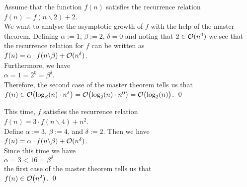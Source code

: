 \example
Assume that the function $f(n)$ satisfies the recurrence relation
\\[0.2cm]
\hspace*{1.3cm}
$f(n) = f(n \backslash 2) + 2$.
\\[0.2cm]
We want to analyse the asymptotic growth of $f$ with the help of the master theorem.
Defining $\alpha := 1$, $\beta := 2$,  $\delta = 0$ and noting that $2 \in \mathcal{O}(n^0)$ we see that
the recurrence relation for $f$ can be written as
\\[0.2cm]
\hspace*{1.3cm}
$f(n) = \alpha \cdot f(n \backslash \beta) + \mathcal{O}(n^\delta)$.
\\[0.2cm]
Furthermore, we have
\\[0.2cm]
\hspace*{1.3cm}
$\alpha = 1 = 2^0 = \beta^\delta$.
\\[0.2cm]
Therefore, the second case of the master theorem tells us that
\\[0.2cm]
\hspace*{1.3cm}
$f(n) \in \mathcal{O}\bigl(\log_\beta(n) \cdot n^\delta\bigr) = \mathcal{O}\bigl(\log_2(n) \cdot n^0\bigr) = \mathcal{O}\bigl(\log_2(n)\bigr)$.
\qed

\example
This time, $f$ satisfies the recurrence relation 
\\[0.2cm]
\hspace*{1.3cm}
$f(n) = 3 \cdot f(n \backslash 4) + n^2$.
\\[0.2cm]
Define $\alpha := 3$, $\beta := 4$, and $\delta := 2$.  Then we have
\\[0.2cm]
\hspace*{1.3cm}
$f(n) = \alpha \cdot f(n \backslash \beta) + \mathcal{O}(n^\delta)$.
\\[0.2cm]
Since this time we have
\\[0.2cm]
\hspace*{1.3cm}
$\alpha = 3 < 16 = \beta^\delta$
\\[0.2cm]
the first case of the master theorem tells us that
\\[0.2cm]
\hspace*{1.3cm}
$f(n) \in \mathcal{O}\bigl(n^2\bigr)$.  \qed

